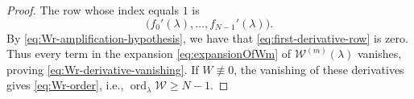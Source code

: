 \documentclass[10pt,a4paper]{amsart}
\newcommand{\cW}{\mathcal W}
\newcommand{\ord}{\operatorname{ord}}
\begin{document}
\begin{proof}
    The row whose index equals $1$ is
    \begin{equation}\label{eq:first-derivative-row}
        \bigl(f_0'(\lambda),\ldots,f_{N-1}'(\lambda)\bigr).
    \end{equation}
    By \eqref{eq:Wr-amplification-hypothesis}, we have that \eqref{eq:first-derivative-row} is zero. Thus every term in the expansion \eqref{eq:expansionOfWm} of $\cW^{(m)}(\lambda)$ vanishes, proving \eqref{eq:Wr-derivative-vanishing}. If $W\not\equiv0$, the vanishing of these derivatives gives \eqref{eq:Wr-order}, i.e., $\ord_\lambda \cW \geq N-1$.
\end{proof}
\end{document}
